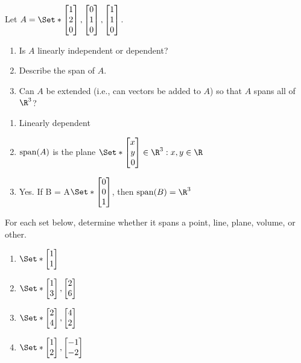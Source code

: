 \begin{exercises}

	\begin{problist}
		\prob Let $A=\Set*{\mat{1\\2\\0},\mat{0\\1\\0},\mat{1\\1\\0}}$.
		\begin{enumerate}
			\item Is $A$
				linearly independent or dependent?

			\item Describe the span of $A$.

			\item Can $A$ be extended (i.e., can vectors be added to $A$) so that
				$A$ spans all of $\R^3$?
		\end{enumerate}
		\begin{solution}
			\begin{enumerate}
				\item Linearly dependent
				\item $\operatorname{span}(A)$ is the plane $\Set*{\mat{x \\y \\0} \in\R^3: x,y\in\R}$
				\item Yes. If B = A\cup$\Set*{\mat{0\\0\\1}}$, then $\Span(B)=\R^3$
			\end{enumerate}
		\end{solution}
		
		\prob For each set below, determine whether it spans a point,
		line, plane, volume, or other. \label{PROBSET3-SETS}
		\begin{enumerate}
			\item $\Set*{\mat{1\\1}}$

			\item $\Set*{\mat{1\\3},\mat{2\\6}}$

			\item $\Set*{\mat{2\\4},\mat{4\\2}}$

			\item $\Set*{\mat{1\\2},\mat{-1\\-2}}$


\end{enumerate}
\end{problist}
\end{exercises}
